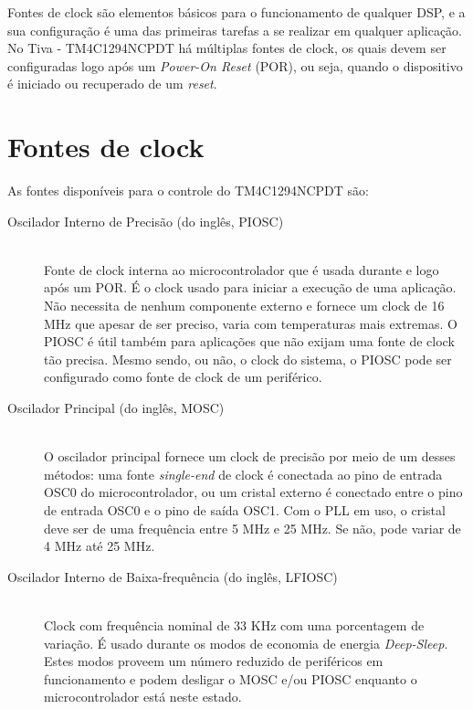 Fontes de clock são elementos básicos para o funcionamento de qualquer DSP, e a sua configuração é uma das primeiras tarefas a se realizar em qualquer aplicação. No Tiva - TM4C1294NCPDT há múltiplas fontes de clock, os quais devem ser configuradas logo após um \emph{Power-On Reset} (POR), ou seja, quando o dispositivo é iniciado ou recuperado de um \emph{reset}.

\section{Fontes de clock}
As fontes disponíveis para o controle do TM4C1294NCPDT são:

\begin{description}
	\item [Oscilador Interno de Precisão (do inglês, PIOSC)]\hfill \\
	Fonte de clock interna ao microcontrolador que é usada durante e logo após um POR. É o clock usado para iniciar a execução de uma aplicação. Não necessita de nenhum componente externo e fornece um clock de 16 MHz que apesar de ser preciso, varia com temperaturas mais extremas. O PIOSC é útil também para aplicações que não exijam uma fonte de clock tão precisa. Mesmo sendo, ou não, o clock do sistema, o PIOSC pode ser configurado como fonte de clock de um periférico.
	
	\item [Oscilador Principal (do inglês, MOSC)]\hfill \\
	O oscilador principal fornece um clock de precisão por meio de um desses métodos: uma fonte \emph{single-end} de clock é conectada ao pino de entrada OSC0 do microcontrolador, ou um cristal externo é conectado entre o pino de entrada OSC0 e o pino de saída OSC1. Com o PLL em uso, o cristal deve ser de uma frequência entre 5 MHz e 25 MHz. Se não, pode variar de 4 MHz até 25 MHz.
	
	\item [Oscilador Interno de Baixa-frequência (do inglês, LFIOSC)]\hfill \\
	Clock com frequência nominal de 33 KHz com uma porcentagem de variação. É usado durante os modos de economia de energia \emph{Deep-Sleep}. Estes modos proveem um número reduzido de periféricos em funcionamento e podem desligar o MOSC e/ou PIOSC enquanto o microcontrolador está neste estado.
	

\end{description}
